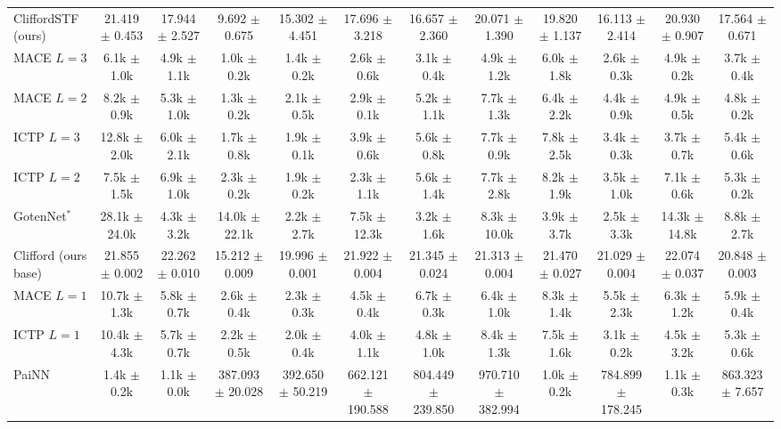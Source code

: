\begin{table}[h]
{\begin{tabular}{lccccccccccc}
CliffordSTF (ours) & 21.419 $\pm$ 0.453 & 17.944 $\pm$ 2.527 & 9.692 $\pm$ 0.675 & 15.302 $\pm$ 4.451 & 17.696 $\pm$ 3.218 & 16.657 $\pm$ 2.360 & 20.071 $\pm$ 1.390 & 19.820 $\pm$ 1.137 & 16.113 $\pm$ 2.414 & 20.930 $\pm$ 0.907 & 17.564 $\pm$ 0.671 \\
MACE $L{=}3$ & 6.1k $\pm$ 1.0k & 4.9k $\pm$ 1.1k & 1.0k $\pm$ 0.2k & 1.4k $\pm$ 0.2k & 2.6k $\pm$ 0.6k & 3.1k $\pm$ 0.4k & 4.9k $\pm$ 1.2k & 6.0k $\pm$ 1.8k & 2.6k $\pm$ 0.3k & 4.9k $\pm$ 0.2k & 3.7k $\pm$ 0.4k \\
MACE $L{=}2$ & 8.2k $\pm$ 0.9k & 5.3k $\pm$ 1.0k & 1.3k $\pm$ 0.2k & 2.1k $\pm$ 0.5k & 2.9k $\pm$ 0.1k & 5.2k $\pm$ 1.1k & 7.7k $\pm$ 1.3k & 6.4k $\pm$ 2.2k & 4.4k $\pm$ 0.9k & 4.9k $\pm$ 0.5k & 4.8k $\pm$ 0.2k \\
ICTP $L{=}3$ & 12.8k $\pm$ 2.0k & 6.0k $\pm$ 2.1k & 1.7k $\pm$ 0.8k & 1.9k $\pm$ 0.1k & 3.9k $\pm$ 0.6k & 5.6k $\pm$ 0.8k & 7.7k $\pm$ 0.9k & 7.8k $\pm$ 2.5k & 3.4k $\pm$ 0.3k & 3.7k $\pm$ 0.7k & 5.4k $\pm$ 0.6k \\
ICTP $L{=}2$ & 7.5k $\pm$ 1.5k & 6.9k $\pm$ 1.0k & 2.3k $\pm$ 0.2k & 1.9k $\pm$ 0.2k & 2.3k $\pm$ 1.1k & 5.6k $\pm$ 1.4k & 7.7k $\pm$ 2.8k & 8.2k $\pm$ 1.9k & 3.5k $\pm$ 1.0k & 7.1k $\pm$ 0.6k & 5.3k $\pm$ 0.2k \\
GotenNet$^{\ast}$ & 28.1k $\pm$ 24.0k & 4.3k $\pm$ 3.2k & 14.0k $\pm$ 22.1k & 2.2k $\pm$ 2.7k & 7.5k $\pm$ 12.3k & 3.2k $\pm$ 1.6k & 8.3k $\pm$ 10.0k & 3.9k $\pm$ 3.7k & 2.5k $\pm$ 3.3k & 14.3k $\pm$ 14.8k & 8.8k $\pm$ 2.7k \\
\midrule
Clifford (ours base) & 21.855 $\pm$ 0.002 & 22.262 $\pm$ 0.010 & 15.212 $\pm$ 0.009 & 19.996 $\pm$ 0.001 & 21.922 $\pm$ 0.004 & 21.345 $\pm$ 0.024 & 21.313 $\pm$ 0.004 & 21.470 $\pm$ 0.027 & 21.029 $\pm$ 0.004 & 22.074 $\pm$ 0.037 & 20.848 $\pm$ 0.003 \\
MACE $L{=}1$ & 10.7k $\pm$ 1.3k & 5.8k $\pm$ 0.7k & 2.6k $\pm$ 0.4k & 2.3k $\pm$ 0.3k & 4.5k $\pm$ 0.4k & 6.7k $\pm$ 0.3k & 6.4k $\pm$ 1.0k & 8.3k $\pm$ 1.4k & 5.5k $\pm$ 2.3k & 6.3k $\pm$ 1.2k & 5.9k $\pm$ 0.4k \\
ICTP $L{=}1$ & 10.4k $\pm$ 4.3k & 5.7k $\pm$ 0.7k & 2.2k $\pm$ 0.5k & 2.0k $\pm$ 0.4k & 4.0k $\pm$ 1.1k & 4.8k $\pm$ 1.0k & 8.4k $\pm$ 1.3k & 7.5k $\pm$ 1.6k & 3.1k $\pm$ 0.2k & 4.5k $\pm$ 3.2k & 5.3k $\pm$ 0.6k \\
PaiNN & 1.4k $\pm$ 0.2k & 1.1k $\pm$ 0.0k & 387.093 $\pm$ 20.028 & 392.650 $\pm$ 50.219 & 662.121 $\pm$ 190.588 & 804.449 $\pm$ 239.850 & 970.710 $\pm$ 382.994 & 1.0k $\pm$ 0.2k & 784.899 $\pm$ 178.245 & 1.1k $\pm$ 0.3k & 863.323 $\pm$ 7.657 \\

\end{tabular}}
\end{table}

